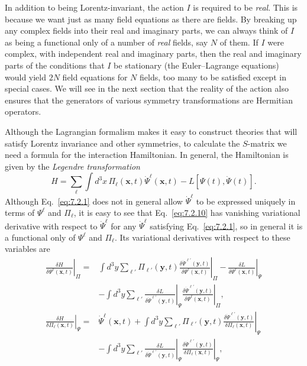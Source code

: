 In addition to being Lorentz-invariant, the action $I$ is required to be
\textit{real}. This is because we want just as many field equations as there are
fields. By breaking up any complex fields into their real and imaginary
parts, we can always think of $I$ as being a functional only of a number
of \textit{real} fields, say $N$ of them. If $I$ were complex, with independent real
and imaginary parts, then the real and imaginary parts of the conditions
that $I$ be stationary (the Euler--Lagrange equations) would yield $2N$ field
equations for $N$ fields, too many to be satisfied except in special cases.
We will see in the next section that the reality of the action also ensures
that the generators of various symmetry transformations are Hermitian
operators.

Although the Lagrangian formalism makes it easy to construct theories
that will satisfy Lorentz invariance and other symmetries, to calculate the
$S$-matrix we need a formula for the interaction Hamiltonian. In general,
the Hamiltonian is given by the \textit{Legendre transformation}
\begin{equation}
H=\sum_\ell\int d^3x\,
\Pi_\ell(\mathbf{x},t)\dot\Psi^\ell(\mathbf{x},t)-L[\Psi(t),\dot\Psi(t)].
\tag{7.2.10}\label{eq:7.2.10}
\end{equation}
Although Eq.~\eqref{eq:7.2.1} does not in general allow $\dot\Psi^\ell$ to be expressed uniquely
in terms of $\Psi^\ell$ and $\Pi_\ell$, it is easy to see that Eq.~\eqref{eq:7.2.10} has vanishing
variational derivative with respect to $\dot\Psi^\ell$ for any $\dot\Psi^\ell$ satisfying
Eq.~\eqref{eq:7.2.1}, so in general it is a functional only of $\Psi^\ell$ and $\Pi_\ell$.
Its variational derivatives with respect to these variables are
\begin{align*}
\left.\frac{\delta H}{\delta\Psi^\ell(\mathbf{x},t)}\right|_{\Pi}
={}&\int d^3y\sum_{\ell'}\Pi_{\ell'}(\mathbf{y},t)
\left.\frac{\delta\dot\Psi^{\ell'}(\mathbf{y},t)}
{\delta\Psi^\ell(\mathbf{x},t)}\right|_{\Pi}
-\left.\frac{\delta L}{\delta\Psi^\ell(\mathbf{x},t)}\right|_{\dot\Psi}
\\
&-\int d^3y\sum_{\ell'}
\left.\frac{\delta L}{\delta\dot\Psi^{\ell'}(\mathbf{y},t)}\right|_{\Psi}
\left.\frac{\delta\dot\Psi^{\ell'}(\mathbf{y},t)}
{\delta\Psi^\ell(\mathbf{x},t)}\right|_{\Pi},
\\[3pt]
\left.\frac{\delta H}{\delta\Pi_\ell(\mathbf{x},t)}\right|_{\Psi}
={}&\dot\Psi^\ell(\mathbf{x},t)
+\int d^3y\sum_{\ell'}\Pi_{\ell'}(\mathbf{y},t)
\left.\frac{\delta\dot\Psi^{\ell'}(\mathbf{y},t)}
{\delta\Pi_\ell(\mathbf{x},t)}\right|_{\Psi}
\\
&-\int d^3y\sum_{\ell'}
\left.\frac{\delta L}{\delta\dot\Psi^{\ell'}(\mathbf{y},t)}\right|_{\Psi}
\left.\frac{\delta\dot\Psi^{\ell'}(\mathbf{y},t)}
{\delta\Pi_\ell(\mathbf{x},t)}\right|_{\Psi},
\end{align*}
